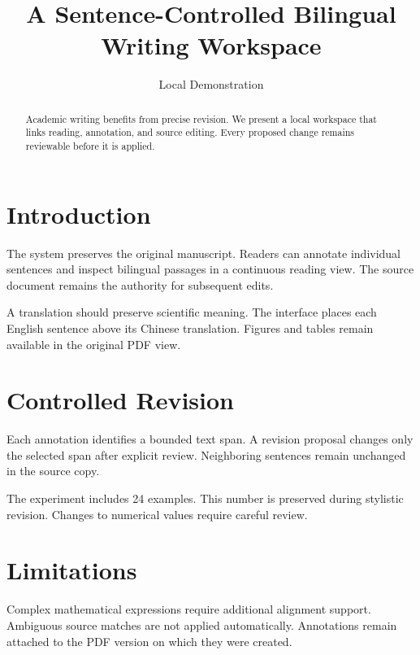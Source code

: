 \documentclass[11pt,twocolumn]{article}
\title{A Sentence-Controlled Bilingual Writing Workspace}
\author{Local Demonstration}
\date{}
\begin{document}
\maketitle
\begin{abstract}
Academic writing benefits from precise revision. We present a local workspace that links reading, annotation, and source editing. Every proposed change remains reviewable before it is applied.
\end{abstract}
\section{Introduction}
The system preserves the original manuscript. Readers can annotate individual sentences and inspect bilingual passages in a continuous reading view. The source document remains the authority for subsequent edits.

A translation should preserve scientific meaning. The interface places each English sentence above its Chinese translation. Figures and tables remain available in the original PDF view.
\section{Controlled Revision}
Each annotation identifies a bounded text span. A revision proposal changes only the selected span after explicit review. Neighboring sentences remain unchanged in the source copy.

The experiment includes 24 examples. This number is preserved during stylistic revision. Changes to numerical values require careful review.
\section{Limitations}
Complex mathematical expressions require additional alignment support. Ambiguous source matches are not applied automatically. Annotations remain attached to the PDF version on which they were created.
\end{document}
